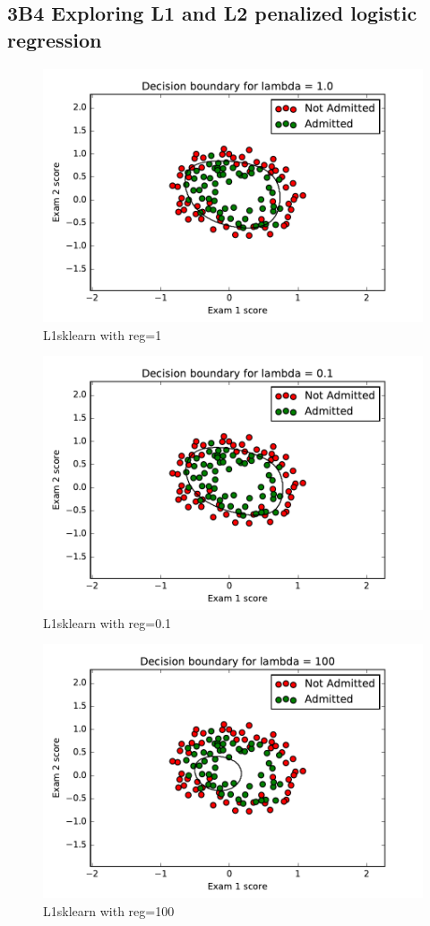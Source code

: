 \documentclass[pdftex,11pt]{article}
\begin{document}
\subsection{3B4 Exploring L1 and L2 penalized logistic regression}
\begin{figure}[H]
  \caption{L1sklearn with reg=1}
  \centering
    \includegraphics[scale=0.5]{fig4sk.pdf}
\end{figure}
\begin{figure}[H]
  \caption{L1sklearn with reg=0.1}
  \centering
    \includegraphics[scale=0.5]{fig4sk01.pdf}
\end{figure}
\begin{figure}[H]
  \caption{L1sklearn with reg=100}
  \centering
    \includegraphics[scale=0.5]{fig4sk100.pdf}
\end{figure}
\end{document}
